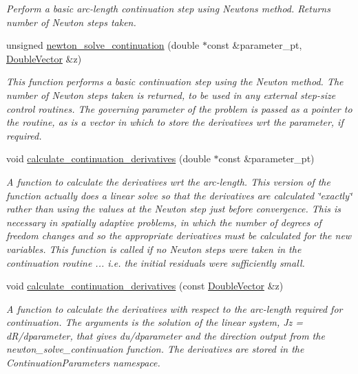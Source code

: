 \begin{DoxyCompactItemize}
\begin{DoxyCompactList}\small\item\em Perform a basic arc-\/length continuation step using Newton\textquotesingle{}s method. Returns number of Newton steps taken. \end{DoxyCompactList}\item 
unsigned \hyperlink{classoomph_1_1Problem_aa539429593ad9ffe3a400a72db2063bd}{newton\+\_\+solve\+\_\+continuation} (double $\ast$const \&parameter\+\_\+pt, \hyperlink{classoomph_1_1DoubleVector}{Double\+Vector} \&z)
\begin{DoxyCompactList}\small\item\em This function performs a basic continuation step using the Newton method. The number of Newton steps taken is returned, to be used in any external step-\/size control routines. The governing parameter of the problem is passed as a pointer to the routine, as is a vector in which to store the derivatives wrt the parameter, if required. \end{DoxyCompactList}\item 
void \hyperlink{classoomph_1_1Problem_a58f16ae8f6da042d40fddf01ee3ebd31}{calculate\+\_\+continuation\+\_\+derivatives} (double $\ast$const \&parameter\+\_\+pt)
\begin{DoxyCompactList}\small\item\em A function to calculate the derivatives wrt the arc-\/length. This version of the function actually does a linear solve so that the derivatives are calculated \char`\"{}exactly\char`\"{} rather than using the values at the Newton step just before convergence. This is necessary in spatially adaptive problems, in which the number of degrees of freedom changes and so the appropriate derivatives must be calculated for the new variables. This function is called if no Newton steps were taken in the continuation routine ... i.\+e. the initial residuals were sufficiently small. \end{DoxyCompactList}\item 
void \hyperlink{classoomph_1_1Problem_a58edae16dc24830521b0df67452db1f7}{calculate\+\_\+continuation\+\_\+derivatives} (const \hyperlink{classoomph_1_1DoubleVector}{Double\+Vector} \&z)
\begin{DoxyCompactList}\small\item\em A function to calculate the derivatives with respect to the arc-\/length required for continuation. The arguments is the solution of the linear system, Jz = d\+R/dparameter, that gives du/dparameter and the direction output from the newton\+\_\+solve\+\_\+continuation function. The derivatives are stored in the Continuation\+Parameters namespace. \end{DoxyCompactList}\item 

\end{DoxyCompactItemize}
